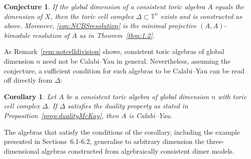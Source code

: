 \documentclass[11pt,a4paper]{amsart}
\numberwithin{equation}{section}
\newtheorem{corollary}[theorem]{Corollary}
\newtheorem{conjecture}[theorem]{Conjecture}
\theoremstyle{definition}
\theoremstyle{remark}
\begin{document}
\begin{conjecture}
If the global dimension of a consistent toric algebra $A$ equals the dimension of $X$, then the toric cell complex $\Delta\subset\mathbb{T}^n$ exists and is constructed as above. Moreover, \eqref{eqn:NCBSresolution} is the minimal projective $(A,A)$-bimodule resolution of $A$ as in Theorem~\ref{thm:1.2}.
\end{conjecture}

As Remark~\ref{rem:notcelldivision} shows, consistent toric algebras of global dimension $n$ need not be Calabi--Yau in general. Nevertheless, assuming the conjecture, a sufficient condition for such algebras to be Calabi--Yau can be read off directly from $\Delta$:

\begin{corollary}
Let $A$ be a consistent toric algebra of global dimension $n$ with toric cell complex $\Delta$. If $\Delta$ satisfies the duality property as stated in Proposition~\ref{prop:dualityMcKay}, then $A$ is Calabi--Yau.
\end{corollary}

The algebras that satisfy the conditions of the corollary, including the example presented in Sections~6.1-6.2,  generalise to arbitrary dimension the three-dimensional algebras constructed from algebraically consistent dimer models.
\end{document}
